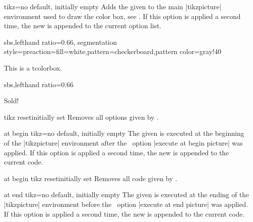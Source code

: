 \begin{docTcbKey}{tikz}{=}{no default, initially empty}
  Adds the given  to the main |tikzpicture| environment
  used to draw the color box, see \cite{tantau:tikz_and_pgf}. If this option is
  applied a second time, the new  is appended to the
  current option list.
\begin{dispExample*}{sbs,lefthand ratio=0.66,
  segmentation style={preaction={fill=white},pattern=checkerboard,pattern color=gray!40}}

\begin{tcolorbox}[title=Transparent box,
  tikz={opacity=0.5,transparency group}]
This is a tcolorbox.
\end{tcolorbox}
\end{dispExample*}

\begin{dispExample*}{sbs,lefthand ratio=0.66}

\begin{tcolorbox}[title=Rotated box,
  tikz={rotate=30}]
Sold!
\end{tcolorbox}
\end{dispExample*}

\end{docTcbKey}


\begin{docTcbKey}{tikz reset}{}{initially set}
  Removes all options given by .
\end{docTcbKey}


\begin{docTcbKey}{at begin tikz}{=}{no default, initially empty}
  The given  is executed at the beginning of the |tikzpicture| environment
  after the \tikzname\  option |execute at begin picture| was applied.
  If this option is applied a second time, the new  is appended to the current code.
\end{docTcbKey}


\begin{docTcbKey}{at begin tikz reset}{}{initially set}
  Removes all code given by .
\end{docTcbKey}


\begin{docTcbKey}{at end tikz}{=}{no default, initially empty}
  The given  is executed at the ending of the |tikzpicture| environment
  before the \tikzname\  option |execute at end picture| was applied.
  If this option is applied a second time, the new  is appended to the current code.
\end{docTcbKey}


